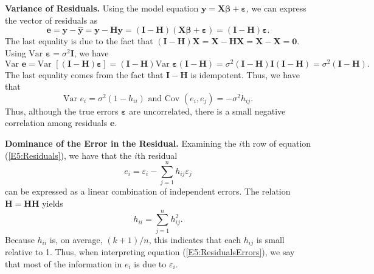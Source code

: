 \textbf{Variance of Residuals.} Using the model equation
$\mathbf{y}=\mathbf{X} \boldsymbol \beta + \boldsymbol \varepsilon$,
we can express the vector of residuals as
\begin{equation}\label{E5:Residuals}
\mathbf{e} = \mathbf{y} - \mathbf{\hat{y}} =
\mathbf{y-Hy}=\mathbf{(I-H)(X \boldsymbol \beta +\boldsymbol
\varepsilon)}=\mathbf{(I-H) \boldsymbol \varepsilon}.
\end{equation}
The last equality is due to the fact that
$\mathbf{(I-H)X}=\mathbf{X-HX}= \mathbf{X-X}=\mathbf{0}$. Using
$\text{Var~} \boldsymbol \varepsilon = \sigma ^2 \mathbf{I}$, we
have
\begin{equation*}
\text{Var }\mathbf{e}=\text{Var }\left[ \mathbf{(I-H)\boldsymbol \varepsilon}\right] =%
\mathbf{(I-H)}\text{Var }\boldsymbol \varepsilon \mathbf{(I-H)}=\sigma ^2\mathbf{(I-H)I(I-H)}%
=\sigma ^2\mathbf{(I-H)}.
\end{equation*}
The last equality comes from the fact that $\mathbf{I-H}$ is
idempotent. Thus, we have that
\begin{equation}\label{E5:VarResiduals}
\text{Var }e_i=\sigma ^2(1-h_{ii})\text{ \ and \ Cov }%
(e_i,e_j)=-\sigma ^2h_{ij}.
\end{equation}
Thus, although the true errors $\boldsymbol \varepsilon$ are
uncorrelated, there is a small negative correlation among residuals
$\mathbf e$.

\textbf{Dominance of the Error in the Residual.} Examining the $i$th
row of equation (\ref{E5:Residuals}), we have that the $i$th
residual
\begin{equation}\label{E5:ResidualsErrors}
e_i=\varepsilon_i - \sum_{j=1}^{n} h_{ij} \varepsilon_j
\end{equation}
can be expressed as a linear combination of independent errors. The
relation $ \mathbf{H}=\mathbf{HH}$ yields
\begin{equation}\label{E5:Leverages}
h_{ii}=\sum_{j=1}^{n} h_{ij}^2.
\end{equation}
Because $h_{ii}$ is, on average, $(k+1)/n$, this indicates that each
$h_{ij}$ is small relative to 1. Thus, when interpreting equation
(\ref{E5:ResidualsErrors}), we say that most of the information in
$e_i$ is due to $\varepsilon_i$.

